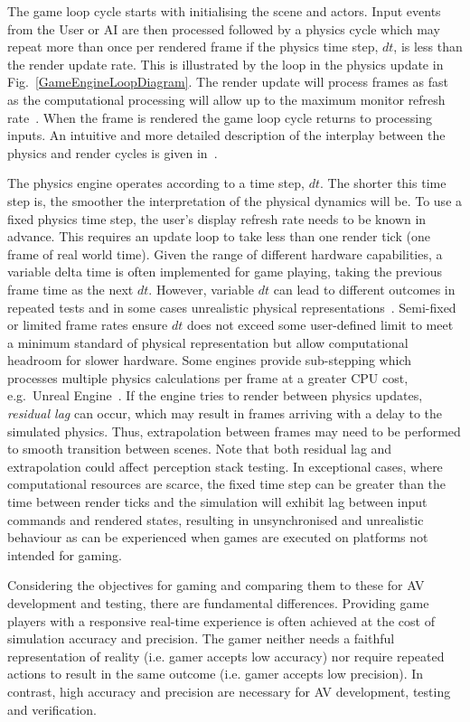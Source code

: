 The game loop cycle starts with initialising the scene and actors. Input events from the User or AI are then processed followed by a physics cycle which may repeat more than once per rendered frame if the physics time step, $dt$, is less than the render update rate. This is illustrated by the loop in the physics update in Fig.~\ref{GameEngineLoopDiagram}. The render update will process frames as fast as the computational processing will allow up to the maximum monitor refresh rate~\cite{unity_framerates}. When the frame is rendered the game loop cycle returns to processing inputs. An intuitive and  more detailed description of the interplay between the physics and render cycles is given in~\cite{JohnAustinUnity}.

The physics engine operates according to a time step, $dt$. The shorter this time step is, the smoother the interpretation of the physical dynamics will be. To use a fixed physics time step, the user's display refresh rate needs to be known in advance. This requires an update loop to take less than one render tick (one frame of real world time). Given the range of different hardware capabilities, a variable delta time is often implemented for game playing, taking the previous frame time as the next $dt$. However, variable $dt$ can lead to different outcomes in repeated tests and in some cases unrealistic physical representations~\cite{gaffer}. 
%
Semi-fixed or limited frame rates ensure $dt$ does not exceed some user-defined limit to meet a minimum standard of physical representation but allow computational headroom for slower hardware. Some engines provide sub-stepping which processes multiple physics calculations per frame at a greater CPU cost, e.g.\ Unreal Engine~\cite{UE4_substepping}. If the engine tries to render between physics updates, \textit{residual lag} can occur, which may result in frames arriving with a delay to the simulated physics. Thus, extrapolation between frames may need to be performed to smooth transition between scenes. Note that both residual lag and extrapolation could affect perception stack testing. In exceptional cases, where computational resources are scarce, the fixed time step can be greater than the time between render ticks and the simulation will exhibit lag between input commands and rendered states, resulting in unsynchronised and unrealistic behaviour as can be experienced when games are executed on platforms not intended for gaming. 

Considering the objectives for gaming and comparing them to these for AV development and testing, there are fundamental differences. Providing game players with a responsive real-time experience is often achieved at the cost of simulation accuracy and precision.
% 
The gamer neither needs a faithful representation of reality (i.e. gamer accepts low accuracy) nor require repeated actions to result in the same outcome (i.e. gamer accepts low precision). In contrast, high accuracy and precision are necessary for AV development, testing and verification.

